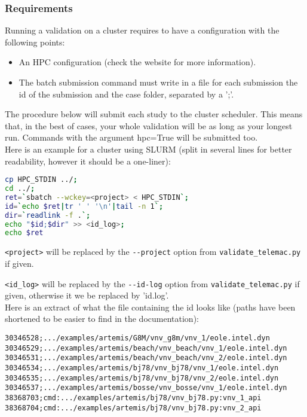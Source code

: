 \subsubsection{Requirements}

Running a validation on a cluster requires to have a configuration with the
following points:
\begin{itemize}
  \item An HPC configuration (check the website for more information).
  \item The batch submission command must write in a file for each submission
    the id of the submission and the case folder, separated by a ';'.
\end{itemize}

The procedure below will submit each \tel study to the cluster scheduler. This
means that, in the best of cases, your whole validation will be as long as your
longest \tel run. Commands with the argument hpc=True will be submitted too.\\

Here is an example for a cluster using SLURM (split in several lines for better
readability, however it should be a one-liner):
\begin{lstlisting}[language=bash]
cp HPC_STDIN ../;
cd ../;
ret=`sbatch --wckey=<project> < HPC_STDIN`;
id=`echo $ret|tr ' ' '\n'|tail -n 1`;
dir=`readlink -f .`;
echo "$id;$dir" >> <id_log>;
echo $ret
\end{lstlisting}

\verb!<project>! will be replaced by the \verb!--project! option from
\verb!validate_telemac.py! if given.

\verb!<id_log>! will be replaced by the \verb!--id-log! option from
\verb!validate_telemac.py! if given, otherwise it we be replaced by 'id.log'.\\

Here is an extract of what the file containing the id looks like (paths have
been shortened to be easier to find in the documentation):
\begin{verbatim}
30346528;.../examples/artemis/G8M/vnv_g8m/vnv_1/eole.intel.dyn
30346529;.../examples/artemis/beach/vnv_beach/vnv_1/eole.intel.dyn
30346531;.../examples/artemis/beach/vnv_beach/vnv_2/eole.intel.dyn
30346534;.../examples/artemis/bj78/vnv_bj78/vnv_1/eole.intel.dyn
30346535;.../examples/artemis/bj78/vnv_bj78/vnv_2/eole.intel.dyn
30346537;.../examples/artemis/bosse/vnv_bosse/vnv_1/eole.intel.dyn
38368703;cmd:.../examples/artemis/bj78/vnv_bj78.py:vnv_1_api
38368704;cmd:.../examples/artemis/bj78/vnv_bj78.py:vnv_2_api
\end{verbatim}

